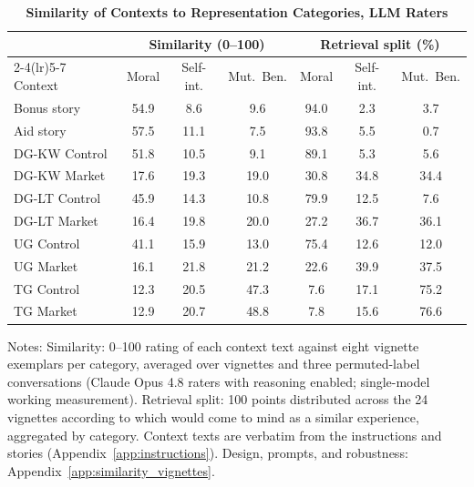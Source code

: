 \begin{table}[!htbp]
\centering
\footnotesize
\renewcommand{\arraystretch}{1.15}
\caption{\textbf{Similarity of Contexts to Representation Categories, LLM Raters}}
\label{tab:similarity_categories}
\begin{tabular}{l ccc ccc}
\toprule
& \multicolumn{3}{c}{Similarity (0--100)} & \multicolumn{3}{c}{Retrieval split (\%)} \\
\cmidrule(lr){2-4}\cmidrule(lr){5-7}
Context & Moral & Self-int. & Mut.\ Ben. & Moral & Self-int. & Mut.\ Ben. \\
\midrule
Bonus story & 54.9 & 8.6 & 9.6 & 94.0 & 2.3 & 3.7 \\
Aid story & 57.5 & 11.1 & 7.5 & 93.8 & 5.5 & 0.7 \\
\midrule
DG-KW Control & 51.8 & 10.5 & 9.1 & 89.1 & 5.3 & 5.6 \\
DG-KW Market & 17.6 & 19.3 & 19.0 & 30.8 & 34.8 & 34.4 \\
DG-LT Control & 45.9 & 14.3 & 10.8 & 79.9 & 12.5 & 7.6 \\
DG-LT Market & 16.4 & 19.8 & 20.0 & 27.2 & 36.7 & 36.1 \\
UG Control & 41.1 & 15.9 & 13.0 & 75.4 & 12.6 & 12.0 \\
UG Market & 16.1 & 21.8 & 21.2 & 22.6 & 39.9 & 37.5 \\
TG Control & 12.3 & 20.5 & 47.3 & 7.6 & 17.1 & 75.2 \\
TG Market & 12.9 & 20.7 & 48.8 & 7.8 & 15.6 & 76.6 \\
\bottomrule
\end{tabular}
\begin{flushleft}
\footnotesize Notes: Similarity: 0--100 rating of each context text against eight vignette exemplars per category, averaged over vignettes and three permuted-label conversations (Claude Opus 4.8 raters with reasoning enabled; single-model working measurement). Retrieval split: 100 points distributed across the 24 vignettes according to which would come to mind as a similar experience, aggregated by category. Context texts are verbatim from the instructions and stories (Appendix~\ref{app:instructions}). Design, prompts, and robustness: Appendix~\ref{app:similarity_vignettes}.
\end{flushleft}
\end{table}
